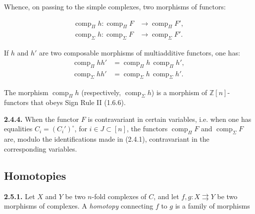 %
Whence, on passing to the simple complexes, two morphisms of functors:

\begin{equation}
  \begin{aligned}
    \operatorname{comp}_{\Pi}h\colon
      \operatorname{comp}_{\Pi}F
      &\longrightarrow \operatorname{comp}_{\Pi}F',\\
    \operatorname{comp}_{\Sigma}h\colon
      \operatorname{comp}_{\Sigma}F
      &\longrightarrow \operatorname{comp}_{\Sigma}F'.
  \end{aligned}
  \tag{2.4.3.2}
\end{equation}

If $h$ and $h'$ are two composable morphisms of multiadditive functors, one
has:
\begin{equation*}
  \begin{aligned}
    \operatorname{comp}_{\Pi}hh'
      &=\operatorname{comp}_{\Pi}h\,\operatorname{comp}_{\Pi}h',\\
    \operatorname{comp}_{\Sigma}hh'
      &=\operatorname{comp}_{\Sigma}h\,\operatorname{comp}_{\Sigma}h'.
  \end{aligned}
\end{equation*}

The morphism $\operatorname{comp}_{\Pi}h$ (respectively,
$\operatorname{comp}_{\Sigma}h$) is a morphism of
$\mathbb Z[n]$-functors that obeys Sign Rule II (1.6.6).

\noindent\textbf{2.4.4.}\quad
When the functor $F$ is contravariant in certain variables, i.e. when one
has equalities $C_i=(C_i')^\circ$, for $i\in J\subset[n]$, the functors
$\operatorname{comp}_{\Pi}F$ and $\operatorname{comp}_{\Sigma}F$ are,
modulo the identifications made in (2.4.1), contravariant in the
corresponding variables.

\subsection{Homotopies}

\noindent\textbf{2.5.1.}\quad
Let $X$ and $Y$ be two $n$-fold complexes of $C$, and let
$f,g\colon X\rightrightarrows Y$ be two morphisms of complexes. A
\emph{homotopy} connecting $f$ to $g$ is a family of morphisms

